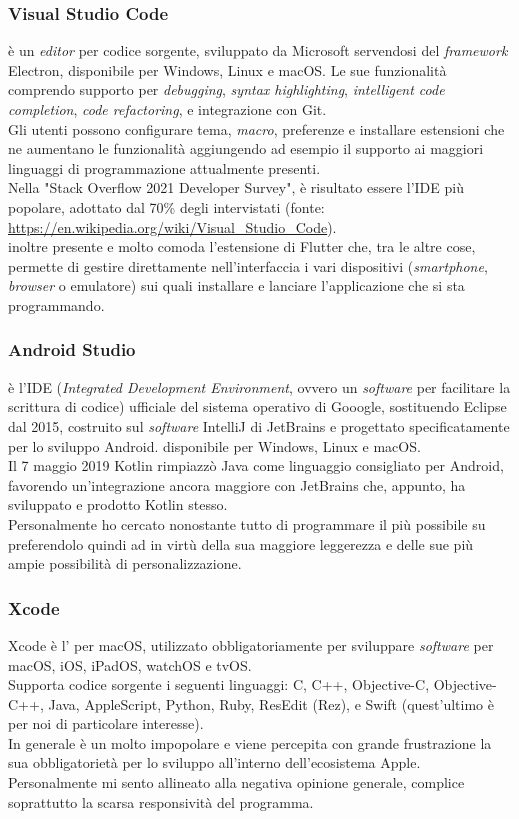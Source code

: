 \subsubsection{Visual Studio Code}
\vsc{} è un \textit{editor} per codice sorgente, sviluppato da Microsoft servendosi del \textit{framework} Electron, disponibile per Windows, Linux e macOS. Le sue funzionalità comprendo supporto per \textit{debugging}, \textit{syntax highlighting}, \textit{intelligent code completion}, \textit{code refactoring}, e integrazione con Git. \\
Gli utenti possono configurare tema, \textit{macro}, preferenze e installare estensioni che ne aumentano le funzionalità aggiungendo ad esempio il supporto ai maggiori linguaggi di programmazione attualmente presenti.\\
Nella "Stack Overflow 2021 Developer Survey", \vsc{} è risultato essere l'IDE più popolare, adottato dal 70\% degli intervistati (fonte: \url{https://en.wikipedia.org/wiki/Visual_Studio_Code}).\\
\e{} inoltre presente e molto comoda l'estensione di Flutter che, tra le altre cose, permette di gestire direttamente nell'interfaccia i vari dispositivi (\textit{smartphone}, \textit{browser} o emulatore) sui quali installare e lanciare l'applicazione che si sta programmando.

\subsubsection{Android Studio}
\astudio{} è l'IDE (\textit{Integrated Development Environment}, ovvero un \textit{software} per facilitare la scrittura di codice) ufficiale del sistema operativo di Gooogle, sostituendo Eclipse dal 2015, costruito sul \textit{software} IntelliJ di JetBrains e progettato specificatamente per lo sviluppo Android. \e{} disponibile per Windows, Linux e macOS.\\
Il 7 maggio 2019 Kotlin rimpiazzò Java come linguaggio consigliato per Android, favorendo un'integrazione ancora maggiore con JetBrains che, appunto, ha sviluppato e prodotto Kotlin stesso.\\
Personalmente ho cercato nonostante tutto di programmare il più possibile su \vsc{} preferendolo quindi ad \astudio{} in virtù della sua maggiore leggerezza e delle sue più ampie possibilità di personalizzazione.

\subsubsection{Xcode}
Xcode è l'\ide{} per macOS, utilizzato obbligatoriamente per sviluppare \textit{software} per macOS, iOS, iPadOS, watchOS e tvOS.\\
Supporta codice sorgente i seguenti linguaggi: C, C++, Objective-C, Objective-C++, Java, AppleScript, Python, Ruby, ResEdit (Rez), e Swift (quest'ultimo è per noi di particolare interesse).\\
In generale è un \ide{} molto impopolare e viene percepita con grande frustrazione la sua obbligatorietà per lo sviluppo all'interno dell'ecosistema Apple. Personalmente mi sento allineato alla negativa opinione generale, complice soprattutto la scarsa responsività del programma.

